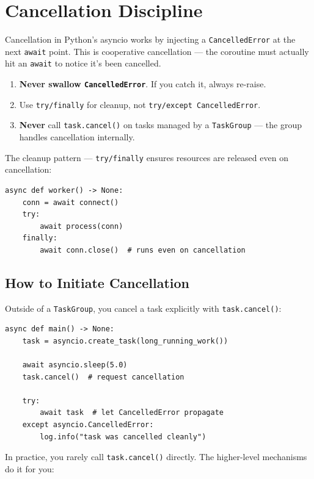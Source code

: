 \documentclass[11pt,a4paper,oneside]{book}
\newcommand{\py}[1]{\texttt{\color{pyblue}#1}}
\begin{document}
\section{Cancellation Discipline}

Cancellation in Python's asyncio works by injecting a \py{CancelledError} at the next
\py{await} point. This is cooperative cancellation --- the coroutine must actually hit an
\py{await} to notice it's been cancelled.

\begin{successbox}[title={The Rules}]
\begin{enumerate}
    \item \textbf{Never swallow \py{CancelledError}}. If you catch it, always re-raise.
    \item Use \py{try/finally} for cleanup, not \py{try/except CancelledError}.
    \item \textbf{Never} call \py{task.cancel()} on tasks managed by a \py{TaskGroup} ---
          the group handles cancellation internally.
\end{enumerate}
\end{successbox}

The cleanup pattern --- \py{try/finally} ensures resources are released even on cancellation:

\begin{lstlisting}[style=python]
async def worker() -> None:
    conn = await connect()
    try:
        await process(conn)
    finally:
        await conn.close()  # runs even on cancellation
\end{lstlisting}

\subsection{How to Initiate Cancellation}

Outside of a \py{TaskGroup}, you cancel a task explicitly with \py{task.cancel()}:

\begin{lstlisting}[style=python]
async def main() -> None:
    task = asyncio.create_task(long_running_work())

    await asyncio.sleep(5.0)
    task.cancel()  # request cancellation

    try:
        await task  # let CancelledError propagate
    except asyncio.CancelledError:
        log.info("task was cancelled cleanly")
\end{lstlisting}

In practice, you rarely call \py{task.cancel()} directly. The higher-level mechanisms do it for you:
\end{document}
